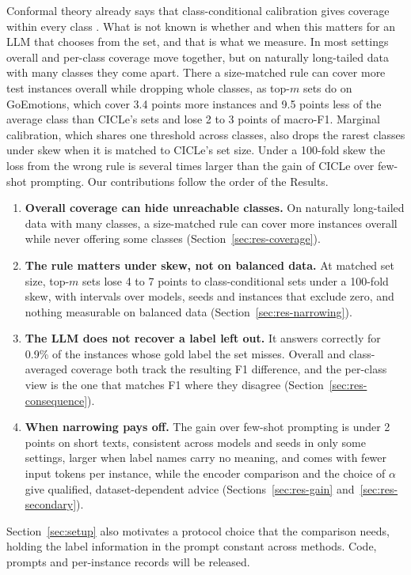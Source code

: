 Conformal theory already says that class-conditional calibration gives coverage within every class \citep{vovk2012conditional}.
What is not known is whether and when this matters for an LLM that chooses from the set, and that is what we measure.
In most settings overall and per-class coverage move together, but on naturally long-tailed data with many classes they come apart.
There a size-matched rule can cover more test instances overall while dropping whole classes, as top-$m$ sets do on GoEmotions, which cover 3.4 points more instances and 9.5 points less of the average class than CICLe's sets and lose 2 to 3 points of macro-F1.
Marginal calibration, which shares one threshold across classes, also drops the rarest classes under skew when it is matched to CICLe's set size. %
Under a 100-fold skew the loss from the wrong rule is several times larger than the gain of CICLe over few-shot prompting.
Our contributions follow the order of the Results.
\begin{enumerate}
  \setlength\itemsep{0pt}
  \item \textbf{Overall coverage can hide unreachable classes.} On naturally long-tailed data with many classes, a size-matched rule can cover more instances overall while never offering some classes (Section~\ref{sec:res-coverage}).
  \item \textbf{The rule matters under skew, not on balanced data.} At matched set size, top-$m$ sets lose 4 to 7 points to class-conditional sets under a 100-fold skew, with intervals over models, seeds and instances that exclude zero, and nothing measurable on balanced data (Section~\ref{sec:res-narrowing}).
  \item \textbf{The LLM does not recover a label left out.} It answers correctly for 0.9\% of the instances whose gold label the set misses. Overall and class-averaged coverage both track the resulting F1 difference, and the per-class view is the one that matches F1 where they disagree (Section~\ref{sec:res-consequence}).
  \item \textbf{When narrowing pays off.} The gain over few-shot prompting is under 2 points on short texts, consistent across models and seeds in only some settings, larger when label names carry no meaning, and comes with fewer input tokens per instance, while the encoder comparison and the choice of $\alpha$ give qualified, dataset-dependent advice (Sections~\ref{sec:res-gain} and~\ref{sec:res-secondary}).
\end{enumerate}
Section~\ref{sec:setup} also motivates a protocol choice that the comparison needs, holding the label information in the prompt constant across methods.
Code, prompts and per-instance records will be released.

